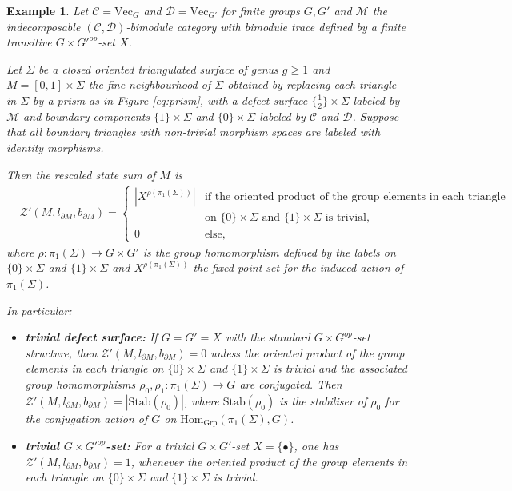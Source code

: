 \documentclass[1.5pt, a4paper]{article}
\newcommand{\mac}{\mathcal C}
\newcommand{\mad}{\mathcal D}
\newcommand{\mam}{\mathcal M}
\newcommand{\Hom}{\mathrm{Hom}}
\newtheorem{example}[theorem]{Example}
\begin{document}
\begin{example}  \label{ex:surface}Let  $\mac=\mathrm{Vec}_G$ and $\mad=\mathrm{Vec}_{G'}$  for finite groups $G,G'$ and $\mam$ the indecomposable $(\mac,\mad)$-bimodule category with bimodule trace defined by a finite transitive  $G\times G'^{op}$-set $X$. 

Let $\Sigma$ be a closed oriented triangulated surface of genus $g\geq 1$ and $M=[0,1]\times\Sigma$ the fine neighbourhood of $\Sigma$
obtained by replacing each triangle in $\Sigma$ by a prism as in Figure \ref{eq:prism}, with a defect surface $\{\tfrac 1 2\}\times\Sigma$ labeled by  $\mam$ and boundary components $\{1\}\times\Sigma$ and $\{0\}\times\Sigma$ labeled by $\mac$ and $\mad$.  Suppose that all boundary triangles with non-trivial morphism spaces are labeled with identity morphisms. 

Then the rescaled state sum of $M$ is 
\begin{align*}
 &\mathcal Z'(M, l_{\partial M}, b_{\partial M})=\begin{cases}
|X^{\rho(\pi_1(\Sigma))}|   & \text{if the oriented product of the group elements in each triangle}\\[-.5ex]
&  \text{on $\{0\}\times\Sigma$ and $\{1\}\times\Sigma$ is trivial,}\\[+1ex]
0 & \text{else},
\end{cases}
\end{align*}
where  $\rho: \pi_1(\Sigma)\to G\times G'$ is the group homomorphism defined by the labels on $\{0\}\times\Sigma$ and $\{1\}\times\Sigma$ and
$X^{\rho(\pi_1(\Sigma))}$ the fixed point set for the induced action of $\pi_1(\Sigma)$. 

In particular:
\begin{itemize}
\item {\bf trivial defect surface:} If $G=G'=X$ with the standard $G\times G^{op}$-set structure, then 
$\mathcal Z'(M, l_{\partial M},b_{\partial M})=0$ unless the oriented product of the group elements in each triangle on $\{0\}\times\Sigma$ and $\{1\}\times\Sigma$ is trivial and the associated group homomorphisms $\rho_0,\rho_1: \pi_1(\Sigma)\to G$ are conjugated. Then
$\mathcal Z'(M, l_{\partial M},b_{\partial M})=|\mathrm{Stab}(\rho_0)|$, where $\mathrm{Stab}(\rho_0)$ is the stabiliser of $\rho_0$ for the conjugation action of $G$ on $\Hom_{\mathrm{Grp}}(\pi_1(\Sigma), G)$. 


\item {\bf trivial $G\times G'^{op}$-set:} For a trivial $G\times G'$-set $X=\{\bullet\}$, one has  
$\mathcal Z'(M, l_{\partial M}, b_{\partial M})=1$, whenever
the oriented product of the group elements in each triangle on $\{0\}\times\Sigma$ and $\{1\}\times\Sigma$ is trivial. 



\end{itemize}
\end{example}
\end{document}
